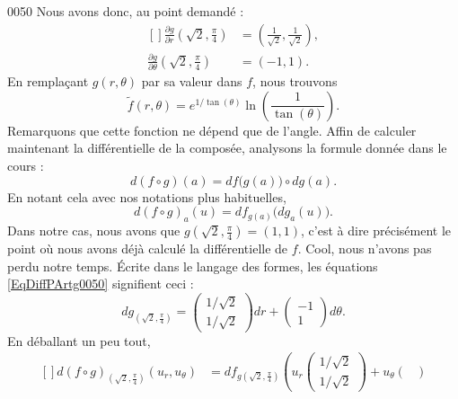 \begin{corrige}{0050}
Nous avons donc, au point demandé :
\begin{equation}		\label{EqDiffPArtg0050}
	\begin{aligned}[]
		\frac{ \partial g }{ \partial r }(\sqrt{2},\frac{ \pi }{ 4 })	&=\left( \frac{1}{ \sqrt{2} },\frac{1}{ \sqrt{2} } \right),\\
		\frac{ \partial g }{ \partial \theta }(\sqrt{2},\frac{ \pi }{ 4 }) 	&=(-1,1).
	\end{aligned}
\end{equation}
En remplaçant $g(r,\theta)$ par sa valeur dans $f$, nous trouvons
\begin{equation}
	\tilde f(r,\theta)= e^{1/\tan(\theta)}\ln\left( \frac{1}{ \tan(\theta) } \right).
\end{equation}
Remarquons que cette fonction ne dépend que de l'angle. Affin de calculer maintenant la différentielle de la composée, analysons la formule donnée dans le cours :
\begin{equation}
	d(f\circ g)(a)=df\big( g(a) \big)\circ dg(a).
\end{equation}
En notant cela avec nos notations plus habituelles,
\begin{equation}
	d(f\circ g)_a(u)=df_{g(a)}\big( dg_a(u) \big).
\end{equation}
Dans notre cas, nous avons que $g(\sqrt{2},\frac{ \pi }{ 4 })=(1,1)$, c'est à dire précisément le point où nous avons déjà calculé la différentielle de $f$. Cool, nous n'avons pas perdu notre temps. Écrite dans le langage des formes, les équations \eqref{EqDiffPArtg0050} signifient ceci :
\begin{equation}
	dg_{(\sqrt{2},\frac{ \pi }{ 4 })}=\begin{pmatrix}
	1/\sqrt{2}	\\ 
	1/\sqrt{2}	
\end{pmatrix}dr+
\begin{pmatrix}
	-1	\\ 
	1	
\end{pmatrix}d\theta.
\end{equation}
En déballant un peu tout,
\begin{equation}
	\begin{aligned}[]
		d(f\circ g)_{(\sqrt{2},\frac{ \pi }{ 4 })}(u_r,u_{\theta})
					&=df_{g (\sqrt{2},\frac{ \pi }{ 4 }) }\left( 
		u_r\begin{pmatrix}
	1/\sqrt{2}	\\ 
	1/\sqrt{2}	
\end{pmatrix} +
u_{\theta}\begin{pmatrix}

\end{pmatrix}
\end{aligned}
\end{equation}
\end{corrige}
